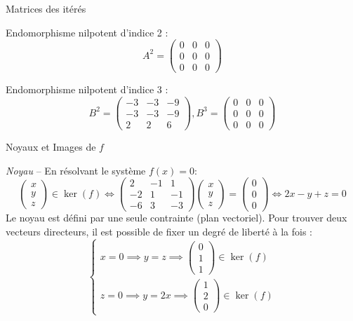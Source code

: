 \documentclass[10pt,a4paper]{article}
\begin{document}
\q Matrices des itérés

Endomorphisme nilpotent d'indice 2 :
\[
A^2 =
\begin{pmatrix}
 0 & 0 & 0\\
 0 & 0 & 0\\
 0 & 0 & 0
\end{pmatrix}
\]


Endomorphisme nilpotent d'indice 3 :
\[
B^2 =
\begin{pmatrix}
 -3 & -3 & -9\\
 -3 & -3 & -9\\
 2 & 2 & 6
\end{pmatrix},
B^3 =
\begin{pmatrix}
 0 & 0 & 0\\
 0 & 0 & 0\\
 0 & 0 & 0
\end{pmatrix}
\]


\q Noyaux et Images de \(f\)

\textit{Noyau} -- En résolvant le système \(f(x) = 0\):
\[
\begin{pmatrix}x \\ y \\ z\end{pmatrix} \in \ker(f) \iff \begin{pmatrix}
 2 & -1 & 1\\
 -2 & 1 & -1\\
 -6 & 3 & -3
\end{pmatrix}
\begin{pmatrix}x \\ y \\ z\end{pmatrix} = \begin{pmatrix}0 \\ 0 \\ 0\end{pmatrix} \iff 2x - y + z = 0
\]
Le noyau est défini par une seule contrainte (plan vectoriel). Pour trouver deux vecteurs
directeurs, il est possible de fixer un degré de liberté à la fois :
\[
\begin{cases}
x = 0 \implies y = z \implies \begin{pmatrix}0 \\ 1 \\ 1\end{pmatrix} \in \ker(f)\\
z = 0 \implies y = 2x \implies \begin{pmatrix}1 \\ 2 \\ 0\end{pmatrix} \in \ker(f)
\end{cases}
\]
\end{document}
